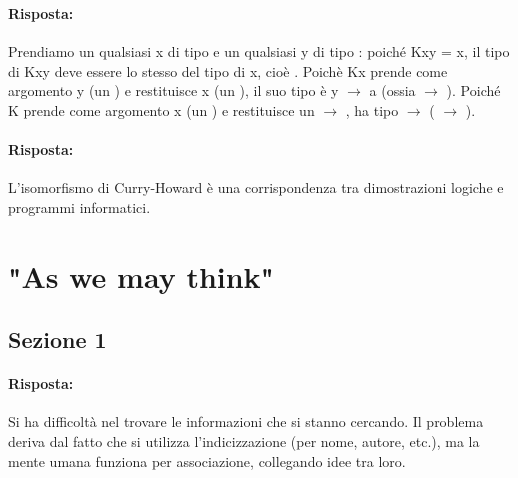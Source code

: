 \subsubsection{}


\paragraph{Risposta:} Prendiamo un qualsiasi x di tipo  e un qualsiasi y di tipo : 
poiché Kxy = x, il tipo di Kxy deve essere lo stesso del tipo di x, cioè . 
Poichè Kx prende come argomento y (un ) e restituisce x (un ),
il suo tipo è y $\rightarrow$ a (ossia  $\rightarrow$ ). 
Poiché K prende come argomento x (un ) e restituisce un 
$\rightarrow$ , ha tipo  $\rightarrow$ (
$\rightarrow$ ).



\paragraph{Risposta:} L'isomorfismo di Curry-Howard è una corrispondenza tra dimostrazioni logiche
e programmi informatici.

\section{"As we may think"}

\subsection{Sezione 1}


\paragraph{Risposta:} Si ha difficoltà nel trovare le informazioni che si stanno cercando.
Il problema deriva dal fatto che si utilizza l'indicizzazione (per nome, autore, etc.), ma 
la mente umana funziona per associazione, collegando idee tra loro.

